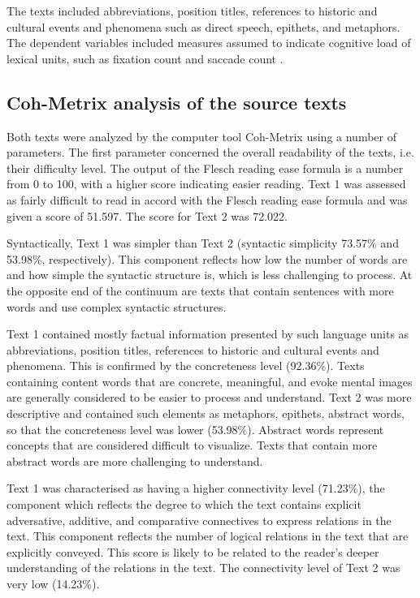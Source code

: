 \documentclass[output=paper]{langscibook}
\begin{document}
The texts included abbreviations, position titles, references to historic and cultural events and phenomena such as direct speech, epithets, and metaphors. The dependent variables included measures assumed to indicate cognitive load of lexical units, such as fixation count and saccade count \citep{Kokanova2018}.

\subsection{Coh-Metrix analysis of the source texts}
Both texts were analyzed by the computer tool Coh-Metrix \citep{Graesser2004} using a number of parameters. The first parameter concerned the overall readability of the texts, i.e. their difficulty level. The output of the Flesch reading ease formula is a number from 0 to 100, with a higher score indicating easier reading. Text 1 was assessed as fairly difficult to read in accord with the Flesch reading ease formula and was given a score of 51.597. The score for Text 2 was 72.022.

Syntactically, Text 1 was simpler than Text 2 (syntactic simplicity 73.57\% and 53.98\%, respectively). This component reflects how low the number of words are and how simple the syntactic structure is, which is less challenging to process. At the opposite end of the continuum are texts that contain sentences with more words and use complex syntactic structures.

Text 1 contained mostly factual information presented by such language units as abbreviations, position titles, references to historic and cultural events and phenomena. This is confirmed by the concreteness level (92.36\%). Texts containing content words that are concrete, meaningful, and evoke mental images are generally considered to be easier to process and understand. Text 2 was more descriptive and contained such elements as metaphors, epithets, abstract words, so that the concreteness level was lower (53.98\%). Abstract words represent concepts that are considered difficult to visualize. Texts that contain more abstract words are more challenging to understand.

Text 1 was characterised as having a higher connectivity level (71.23\%), the component which reflects the degree to which the text contains explicit adversative, additive, and comparative connectives to express relations in the text. This component reflects the number of logical relations in the text that are explicitly conveyed. This score is likely to be related to the reader’s deeper understanding of the relations in the text. The connectivity level of Text 2 was very low (14.23\%).
\end{document}
